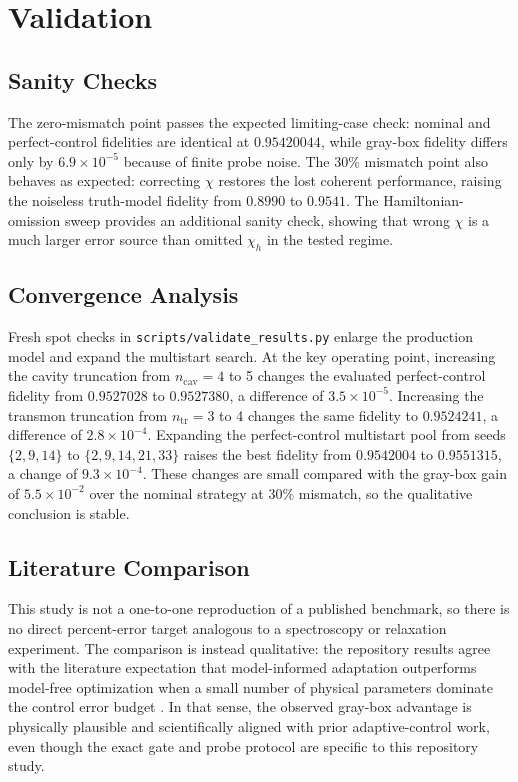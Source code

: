 \documentclass[aps,pra,twocolumn,reprint,amsmath,amssymb]{revtex4-2}
\begin{document}
\section{Validation}

\subsection{Sanity Checks}

The zero-mismatch point passes the expected limiting-case check: nominal and perfect-control
fidelities are identical at $0.95420044$, while gray-box fidelity differs only by
$6.9 \times 10^{-5}$ because of finite probe noise. The 30\% mismatch point also behaves as
expected: correcting $\chi$ restores the lost coherent performance, raising the noiseless
truth-model fidelity from $0.8990$ to $0.9541$. The Hamiltonian-omission sweep provides an
additional sanity check, showing that wrong $\chi$ is a much larger error source than omitted
$\chi_h$ in the tested regime.

\subsection{Convergence Analysis}

Fresh spot checks in \texttt{scripts/validate\_results.py} enlarge the production model and expand the
multistart search. At the key operating point, increasing the cavity truncation from
$n_{\mathrm{cav}} = 4$ to 5 changes the evaluated perfect-control fidelity from
$0.9527028$ to $0.9527380$, a difference of $3.5 \times 10^{-5}$. Increasing the transmon
truncation from $n_{\mathrm{tr}} = 3$ to 4 changes the same fidelity to $0.9524241$, a
difference of $2.8 \times 10^{-4}$. Expanding the perfect-control multistart pool from
seeds $\{2,9,14\}$ to $\{2,9,14,21,33\}$ raises the best fidelity from $0.9542004$ to
$0.9551315$, a change of $9.3 \times 10^{-4}$. These changes are small compared with the
gray-box gain of $5.5 \times 10^{-2}$ over the nominal strategy at 30\% mismatch, so the
qualitative conclusion is stable.

\subsection{Literature Comparison}

This study is not a one-to-one reproduction of a published benchmark, so there is no direct
percent-error target analogous to a spectroscopy or relaxation experiment. The comparison is
instead qualitative: the repository results agree with the literature expectation that
model-informed adaptation outperforms model-free optimization when a small number of physical
parameters dominate the control error budget \cite{egger2014,kelly2014}. In that sense, the
observed gray-box advantage is physically plausible and scientifically aligned with prior
adaptive-control work, even though the exact gate and probe protocol are specific to this
repository study.
\end{document}
